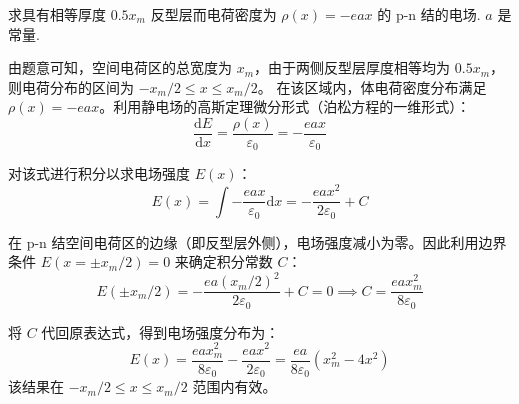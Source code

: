 \begin{exercise}\label{ex:15.9}
求具有相等厚度 $0.5x_m$ 反型层而电荷密度为 $\rho(x) = -eax$ 的 p-n 结的电场. $a$ 是常量.
\end{exercise}
\begin{solution}
由题意可知，空间电荷区的总宽度为 $x_m$，由于两侧反型层厚度相等均为 $0.5x_m$，则电荷分布的区间为 $-x_m/2 \le x \le x_m/2$。
在该区域内，体电荷密度分布满足 $\rho(x) = -eax$。利用静电场的高斯定理微分形式（泊松方程的一维形式）：
$$ \frac{\mathrm{d}E}{\mathrm{d}x} = \frac{\rho(x)}{\varepsilon_0} = -\frac{eax}{\varepsilon_0} $$

对该式进行积分以求电场强度 $E(x)$：
$$ E(x) = \int -\frac{eax}{\varepsilon_0} \mathrm{d}x = -\frac{eax^2}{2\varepsilon_0} + C $$

在 p-n 结空间电荷区的边缘（即反型层外侧），电场强度减小为零。因此利用边界条件 $E(x = \pm x_m/2) = 0$ 来确定积分常数 $C$：
$$ E(\pm x_m/2) = -\frac{ea(x_m/2)^2}{2\varepsilon_0} + C = 0 \implies C = \frac{ea x_m^2}{8\varepsilon_0} $$

将 $C$ 代回原表达式，得到电场强度分布为：
$$ E(x) = \frac{ea x_m^2}{8\varepsilon_0} - \frac{eax^2}{2\varepsilon_0} = \frac{ea}{8\varepsilon_0} \left( x_m^2 - 4x^2 \right) $$
该结果在 $-x_m/2 \le x \le x_m/2$ 范围内有效。
\end{solution}

